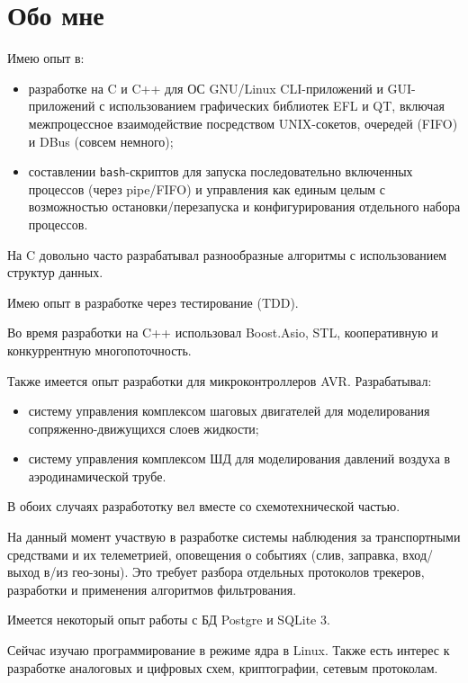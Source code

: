 \documentclass[11pt,a4paper,russian]{moderncv}
\begin{document}
\section{Обо мне}
\par{Имею опыт в:}
\begin{itemize}
\item разработке на C и C++ для ОС GNU/Linux CLI-приложений и GUI-приложений с использованием графических библиотек EFL и QT, включая межпроцессное взаимодействие посредством UNIX-сокетов, очередей (FIFO) и DBus (совсем немного);
\item составлении \texttt{bash}-скриптов для запуска последовательно включенных процессов (через pipe/FIFO) и управления как единым целым с возможностью остановки/перезапуска и конфигурирования отдельного набора процессов.
\end{itemize}
\par{На C довольно часто разрабатывал разнообразные алгоритмы с использованием структур данных.}
\par{Имею опыт в разработке через тестирование (TDD).}
\par{Во время разработки на C++ использовал Boost.Asio, STL, кооперативную и конкуррентную многопоточность.}
\par{Также имеется опыт разработки для микроконтроллеров AVR. Разрабатывал:}
\begin{itemize}
\item систему управления комплексом шаговых двигателей для моделирования сопряженно-движущихся слоев жидкости;
\item систему управления комплексом ШД для моделирования давлений воздуха в аэродинамической трубе.
\end{itemize}
\par{В обоих случаях разработотку вел вместе со схемотехнической частью.}
\par{На данный момент участвую в разработке системы наблюдения за транспортными средствами и их телеметрией, оповещения о событиях (слив, заправка, вход/выход в/из гео-зоны). Это требует разбора отдельных протоколов трекеров, разработки и применения алгоритмов фильтрования.}
\par{Имеется некоторый опыт работы с БД Postgre и SQLite 3.}
\par{Сейчас изучаю программирование в режиме ядра в Linux. Также есть интерес к разработке аналоговых и цифровых схем, криптографии, сетевым протоколам.}




\clearpage
\end{document}

